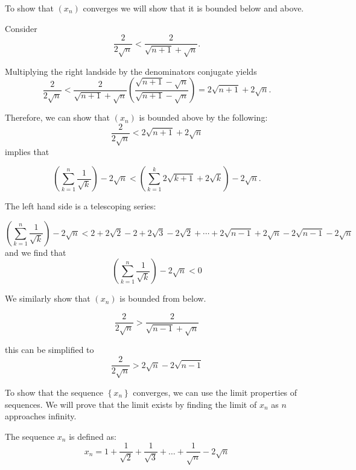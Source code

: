 \documentclass{report}
\begin{document}
\begin{myproof}
    To show that $(x_n)$ converges we will show that it is bounded below and above. 

    Consider $$\frac{2}{2 \sqrt{n}} < \frac{2}{\sqrt{n+1} + \sqrt{n}}.$$

Multiplying the right landside by the denominators conjugate yields
 $$\frac{2}{2 \sqrt{n}} < \frac{2}{\sqrt{n+1} + \sqrt{n}} \left(\frac{\sqrt{n+1} - \sqrt{n}}{\sqrt{n+1} - \sqrt{n}}  \right) = 2\sqrt{n+1} + 2\sqrt{n}.$$

 Therefore, we can show that $(x_n)$ is bounded above by the following:
 $$\frac{2}{2 \sqrt{n}} < 2\sqrt{n+1} + 2\sqrt{n} $$ implies  that 

 $$
\left(\sum_{k=1}^{n} \frac{1}{\sqrt{k}} \right)-2 \sqrt{n} < \left( \sum_{k=1}^{k} 2\sqrt{k+1} + 2\sqrt{k} \right) - 2\sqrt{n}
 .$$

 The left hand side is a telescoping series:

 $$
\left(\sum_{k=1}^{n} \frac{1}{\sqrt{k}} \right)-2 \sqrt{n} < 2 + 2\sqrt{2} - 2 + 2\sqrt{3}- 2\sqrt{2} + \cdots + 2\sqrt{n-1} + 2\sqrt{n} - 2 \sqrt{n-1} - 2\sqrt{n}
$$
and we find that
 $$
\left(\sum_{k=1}^{n} \frac{1}{\sqrt{k}} \right)-2 \sqrt{n} < 0 $$

We similarly show that $(x_n)$ is bounded from below.

$$\frac{2}{2 \sqrt{n}} > \frac{2}{\sqrt{n-1} + \sqrt{n}}$$

this can be simplified to
 $$\frac{2}{2 \sqrt{n}} > 2\sqrt{n} - 2\sqrt{n-1}  $$
\end{myproof}




To show that the sequence $\left\{x_n\right\}$ converges, we can use the limit properties of sequences. We will prove that the limit exists by finding the limit of $x_n$ as $n$ approaches infinity.

The sequence $x_n$ is defined as:
$$
x_n=1+\frac{1}{\sqrt{2}}+\frac{1}{\sqrt{3}}+\ldots+\frac{1}{\sqrt{n}}-2 \sqrt{n}
$$
\end{document}
